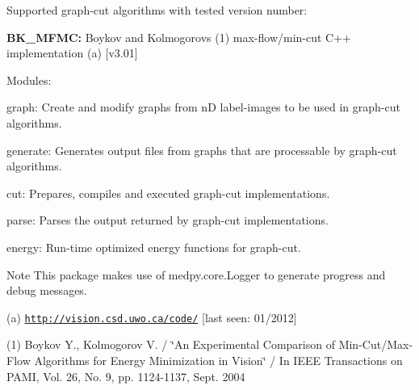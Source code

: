 Supported graph-\/cut algorithms with tested version number:\par

\begin{DoxyItemize}
\item {\bfseries BK\_\-MFMC:} Boykov and Kolmogorovs (1) max-\/flow/min-\/cut C++ implementation (a) \mbox{[}v3.01\mbox{]}
\end{DoxyItemize}

Modules:
\begin{DoxyItemize}
\item graph: Create and modify graphs from nD label-\/images to be used in graph-\/cut algorithms.
\item generate: Generates output files from graphs that are processable by graph-\/cut algorithms.
\item cut: Prepares, compiles and executed graph-\/cut implementations.
\item parse: Parses the output returned by graph-\/cut implementations.
\item energy: Run-\/time optimized energy functions for graph-\/cut.
\end{DoxyItemize}

\begin{DoxyNote}{Note}
This package makes use of  medpy.core.Logger to generate progress and debug messages.
\end{DoxyNote}
(a) \href{http://vision.csd.uwo.ca/code/}{\tt http://vision.csd.uwo.ca/code/} \mbox{[}last seen: 01/2012\mbox{]}

(1) Boykov Y., Kolmogorov V. / \char`\"{}An Experimental Comparison of Min-\/Cut/Max-\/Flow
 Algorithms for Energy Minimization in Vision\char`\"{} / In IEEE Transactions on PAMI, Vol. 26, No. 9, pp. 1124-\/1137, Sept. 2004 